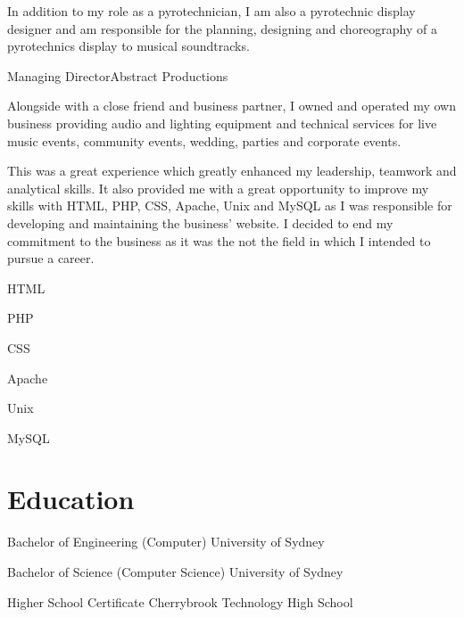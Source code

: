 \documentclass[10pt]{article}
\begin{document}
\begin{professionalExperience}
{In addition to my role as a pyrotechnician, I am also a pyrotechnic display 
designer and am responsible for the planning, designing and choreography of a 
pyrotechnics display to musical soundtracks.}
{}

{Managing Director}{Abstract Productions}
{Alongside with a close friend and business partner, I owned and operated my own
business providing audio and lighting equipment and technical services for live
music events, community events, wedding, parties and corporate events.

This was a great experience which greatly enhanced my leadership, teamwork and 
analytical skills. It also provided me with a great opportunity to improve my 
skills with HTML, PHP, CSS, Apache, Unix and MySQL as I was responsible for 
developing and maintaining the business' website. I decided to end my commitment
to the business as it was the not the field in which I intended to pursue a 
career.}
{\item HTML
\item PHP
\item CSS
\item Apache
\item Unix
\item MySQL}

\end{professionalExperience}

\section*{Education}
\begin{education}

{Bachelor of Engineering (Computer)}
{University of Sydney}
{}

{Bachelor of Science (Computer Science)}
{University of Sydney}
{}

{Higher School Certificate}
{Cherrybrook Technology High School}
{
}
\end{education}
\end{document}
